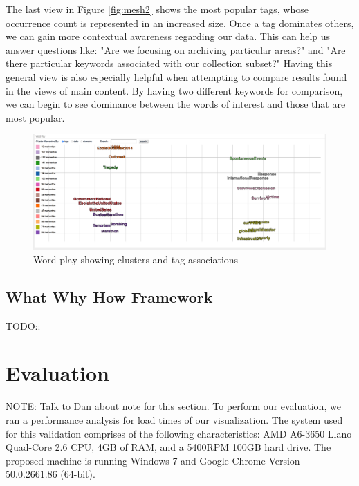 \documentclass[10pt,journal,compsoc]{IEEEtran}
\begin{document}
The last view in Figure \ref{fig:mesh2} shows the most popular tags, whose occurrence count is represented in an increased size. Once a tag dominates others, we can gain more contextual awareness regarding our data. This can help us answer questions like: "Are we focusing on archiving particular areas?" and "Are there particular keywords associated with our collection subset?" Having this general view is also especially helpful when attempting to compare results found in the views of main content. By having two different keywords for comparison, we can begin to see dominance between the words of interest and those that are most popular. \par

\begin{figure}
\centering
\includegraphics[width=\textwidth]{Figure6}
\caption{Word play showing clusters and tag associations}
\label{fig:mesh6}
\end{figure}


\subsection{What Why How Framework}
TODO::

\section{Evaluation}

NOTE: Talk to Dan about note for this section.
To perform our evaluation, we ran a performance analysis for load times of our visualization. The system used for this validation comprises of the following characteristics: AMD A6-3650 Llano Quad-Core 2.6 CPU, 4GB of RAM, and a 5400RPM 100GB hard drive. The proposed machine is running Windows 7 and Google Chrome Version 50.0.2661.86 (64-bit). \par
\end{document}
